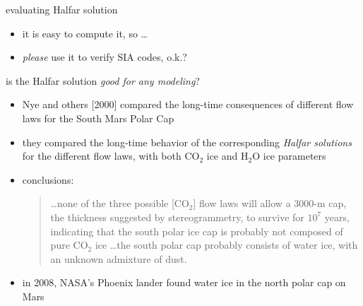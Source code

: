 \begin{frame}{evaluating Halfar solution}


\begin{itemize}
\item it is easy to compute it, so \dots
\item \emph{please} use it to verify SIA codes, o.k.?
\end{itemize}
\end{frame}


\begin{frame}{is the Halfar solution \emph{good for any modeling}?}

\begin{itemize}
\item Nye and others [2000] compared the long-time consequences of different flow laws for the South Mars Polar Cap
\item they compared the long-time behavior of the corresponding \emph{Halfar solutions} for the different flow laws, with both $\text{CO}_2$ ice and $\text{H}_2\text{O}$ ice parameters
\item conclusions:
  \begin{quote}
  \dots none of the three possible [$\text{CO}_2$] flow laws will allow a 3000-m cap, the thickness suggested by stereogrammetry, to survive for $10^7$ years, indicating that the south polar ice cap is probably not composed of pure $\text{CO}_2$ ice \dots the south polar cap probably consists of water ice, with an unknown admixture of dust.
  \end{quote}
\item in 2008, NASA's Phoenix lander found water ice in the north polar cap on Mars
\end{itemize}
\end{frame}


